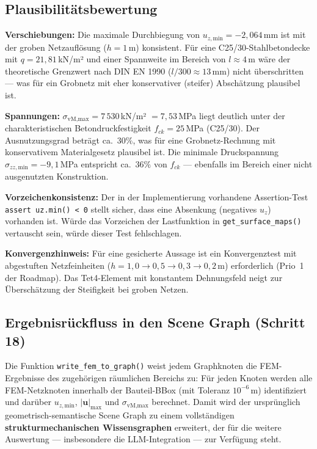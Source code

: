 \documentclass[a4paper,11pt]{article}
\begin{document}
\subsection{Plausibilitätsbewertung}

\textbf{Verschiebungen:} Die maximale Durchbiegung von $u_{z,\text{min}} = -2{,}064$\,mm ist mit der groben Netzauflösung ($h = 1$\,m) konsistent. Für eine C25/30-Stahlbetondecke mit $q = 21{,}81$\,kN/m² und einer Spannweite im Bereich von $l \approx 4$\,m wäre der theoretische Grenzwert nach DIN EN 1990 ($l/300 \approx 13$\,mm) nicht überschritten — was für ein Grobnetz mit eher konservativer (steifer) Abschätzung plausibel ist.

\textbf{Spannungen:} $\sigma_\text{vM,max} = 7\,530$\,kN/m² $= 7{,}53$\,MPa liegt deutlich unter der charakteristischen Betondruckfestigkeit $f_{ck} = 25$\,MPa (C25/30). Der Ausnutzungsgrad beträgt ca.\ $30\%$, was für eine Grobnetz-Rechnung mit konservativem Materialgesetz plausibel ist. Die minimale Druckspannung $\sigma_{zz,\text{min}} = -9{,}1$\,MPa entspricht ca.\ $36\%$ von $f_{ck}$ — ebenfalls im Bereich einer nicht ausgenutzten Konstruktion.

\textbf{Vorzeichenkonsistenz:} Der in der Implementierung vorhandene Assertion-Test \texttt{assert uz.min() < 0} stellt sicher, dass eine Absenkung (negatives $u_z$) vorhanden ist. Würde das Vorzeichen der Lastfunktion in \texttt{get\_surface\_maps()} vertauscht sein, würde dieser Test fehlschlagen.

\textbf{Konvergenzhinweis:} Für eine gesicherte Aussage ist ein Konvergenztest mit abgestuften Netzfeinheiten ($h = 1{,}0 \to 0{,}5 \to 0{,}3 \to 0{,}2$\,m) erforderlich (Prio~1 der Roadmap). Das Tet4-Element mit konstantem Dehnungsfeld neigt zur Überschätzung der Steifigkeit bei groben Netzen.

\subsection{Ergebnisrückfluss in den Scene Graph (Schritt 18)}

Die Funktion \texttt{write\_fem\_to\_graph()} weist jedem Graphknoten die FEM-Ergebnisse des zugehörigen räumlichen Bereichs zu: Für jeden Knoten werden alle FEM-Netzknoten innerhalb der Bauteil-BBox (mit Toleranz $10^{-6}$\,m) identifiziert und darüber $u_{z,\text{min}}$, $|\mathbf{u}|_\text{max}$ und $\sigma_{\text{vM,max}}$ berechnet. Damit wird der ursprünglich geometrisch-semantische Scene Graph zu einem vollständigen \textbf{strukturmechanischen Wissensgraphen} erweitert, der für die weitere Auswertung — insbesondere die LLM-Integration — zur Verfügung steht.
\end{document}

